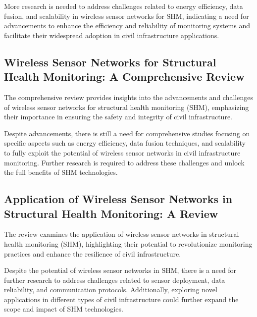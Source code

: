 \documentclass[journal, a4paper]{IEEEtran}
\begin{document}
\begin{description}[style=standard, font=\normalfont]
  \item[Research gap:] More research is needed to address challenges related to energy efficiency, data fusion, and scalability in wireless sensor networks for SHM, indicating a need for advancements to enhance the efficiency and reliability of monitoring systems and facilitate their widespread adoption in civil infrastructure applications. 
\end{description}


\subsection{Wireless Sensor Networks for Structural Health Monitoring: A Comprehensive Review}
The comprehensive review provides insights into the advancements and challenges of wireless sensor networks for structural health monitoring (SHM), emphasizing their importance in ensuring the safety and integrity of civil infrastructure. 

\begin{description}[style=standard, font=\normalfont]
  \item[Research gap:] Despite advancements, there is still a need for comprehensive studies focusing on specific aspects such as energy efficiency, data fusion techniques, and scalability to fully exploit the potential of wireless sensor networks in civil infrastructure monitoring. Further research is required to address these challenges and unlock the full benefits of SHM technologies.
\end{description}

 
\subsection{Application of Wireless Sensor Networks in Structural Health Monitoring: A Review}
The review examines the application of wireless sensor networks in structural health monitoring (SHM), highlighting their potential to revolutionize monitoring practices and enhance the resilience of civil infrastructure. 

\begin{description}[style=standard, font=\normalfont]
  \item[Research gap:] Despite the potential of wireless sensor networks in SHM, there is a need for further research to address challenges related to sensor deployment, data reliability, and communication protocols. Additionally, exploring novel applications in different types of civil infrastructure could further expand the scope and impact of SHM technologies.
\end{description}
\end{document}
